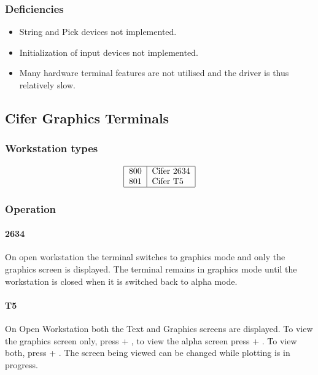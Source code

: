 \subsubsection{Deficiencies}
\begin{itemize}
\item String and Pick devices not implemented.
\item Initialization of input devices not implemented.
\item Many hardware terminal features are not utilised and the driver is
      thus relatively slow.
\end{itemize}

\subsection{Cifer Graphics Terminals}
\label{cifgt}
\subsubsection{Workstation types}
\[\begin{tabular}{|l|l|}\hline
800 &Cifer 2634\\
801 &Cifer T5\\\hline
\end{tabular}\]

\subsubsection{Operation}

\paragraph{2634}
On open workstation the terminal switches to graphics mode and only the
graphics screen is displayed.
The terminal remains in graphics mode until the workstation is closed when it is
switched back to alpha mode.
\paragraph{T5}
On Open Workstation both the Text and Graphics screens are displayed.
To view the graphics screen only, press  + , to view 
the alpha screen press  + .
To view both, press  + .
The screen being viewed can be changed while plotting is in progress.
